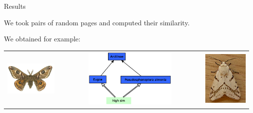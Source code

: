 \documentclass[xcolor=dvipsnames]{beamer}
\begin{document}
\begin{frame}{Results}

We took pairs of random pages and computed their similarity. 

We obtained for example: 

\begin{center}
\begin{minipage}{\textwidth}
\begin{tabular}{c  c c}
\includegraphics[scale=0.4]{media/moth2.eps} 
& \includegraphics[width=0.6\textwidth, height=0.4\paperheight]{media/moths.eps}
& \includegraphics[scale=0.4]{media/moth1.eps}\\

\end{tabular}
\end{minipage}
\end{center}

\end{frame}
\end{document}
